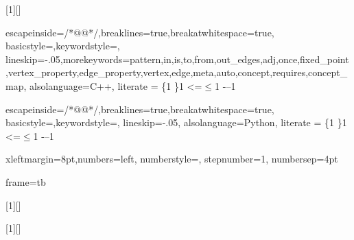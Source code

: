 [1][\small]
{
  \lstset{
    style=C++,
    basicstyle=#1\sffamily,
    keywordstyle=#1\sffamily,
    commentstyle=#1\sffamily,
  }
}
{ }


\usepackage{tikz}

{%
escapeinside={/*@}{@*/},breaklines=true,breakatwhitespace=true,%
basicstyle=\color{lightblue},keywordstyle=,%
lineskip=-.05\baselineskip,morekeywords={pattern,in,is,to,from,out_edges,adj,once,fixed_point,vertex_property,edge_property,vertex,edge,meta,auto,concept,requires,concept_map},%
alsolanguage=C++,
literate = %
  {\{}{\smaller{$\{$}}{1}%
  {\}}{\smaller{$\}$}}{1}%
  {<=}{$\leq$}{1}%
  {-}{--}{1}%
}

{%
escapeinside={/*@}{@*/},breaklines=true,breakatwhitespace=true,%
basicstyle=\color{lightblue},keywordstyle=,%
lineskip=-.05\baselineskip,%
alsolanguage=Python,
literate = %
  {\{}{\smaller{$\{$}}{1}%
  {\}}{\smaller{$\}$}}{1}%
  {<=}{$\leq$}{1}%
  {-}{--}{1}%
}

{xleftmargin=8pt,numbers=left, numberstyle=\tiny,%
stepnumber=1, numbersep=4pt}

{frame=tb}


[1][\small]{}{}

\newif\ifminted
\mintedtrue
\ifminted
\usepackage{minted}
\newenvironment{cplus}{\VerbatimEnvironment\begin{cppcode}}{\end{cppcode}}
\newenvironment{python}{\VerbatimEnvironment\begin{python3code}}{\end{python3code}}
\else
{}[1][\footnotesize]{}{}

